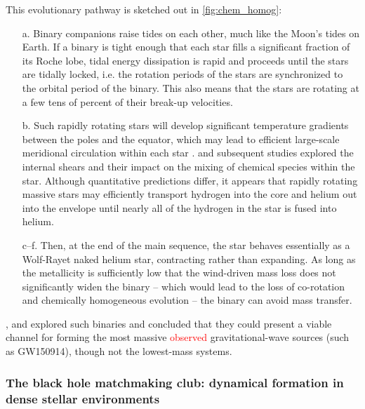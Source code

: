 \documentclass[iop,onecolumn]{revtex4}
\newcommand{\ajf}[1]{\textcolor{red}{#1}}
\begin{document}
This evolutionary pathway is sketched out in \autoref{fig:chem_homog}:
\begin{itemize}
\item[a.] Binary companions raise tides on each other, much like the Moon's tides on Earth.  If a binary is tight enough that each star fills a significant fraction of its Roche lobe, tidal energy dissipation is rapid and proceeds until the stars are tidally locked, i.e. the rotation periods of the stars are synchronized to the orbital period of the binary. This also means that the stars are rotating at a few tens of percent of their break-up velocities.  
\item[b.] Such rapidly rotating stars will develop significant temperature gradients between the poles and the equator, which may lead to efficient large-scale meridional circulation within each star \citep{Eddington:1925,Sweet:1950}.  \citet{EndalSofia:1978} and subsequent studies \citep[e.g.,][]{Heger:2000,MaederMeynet:2000,Yoon:2006,Szecsi:2015} explored the internal shears and their impact on the mixing of chemical species within the star.  Although quantitative predictions differ, it appears that rapidly rotating massive stars may efficiently transport hydrogen into the core and helium out into the envelope until nearly all of the hydrogen in the star is fused into helium.  
\item[c--f.] Then, at the end of the main sequence, the star behaves essentially as a Wolf-Rayet naked helium star, contracting rather than expanding. As long as the metallicity is sufficiently low that the wind-driven mass loss does not significantly widen the binary -- which would lead to the loss of co-rotation and chemically homogeneous evolution \citep{deMink:2009} -- the binary can avoid mass transfer.  
\end{itemize}

\citet{MandeldeMink:2016,deMinkMandel:2016}, and \citet{Marchant:2016} explored such binaries and concluded that they could present a viable channel for forming the most massive \ajf{observed} gravitational-wave sources (such as GW150914), though not the lowest-mass systems.  

\subsubsection{The black hole matchmaking club: dynamical formation in dense stellar environments}
\end{document}
